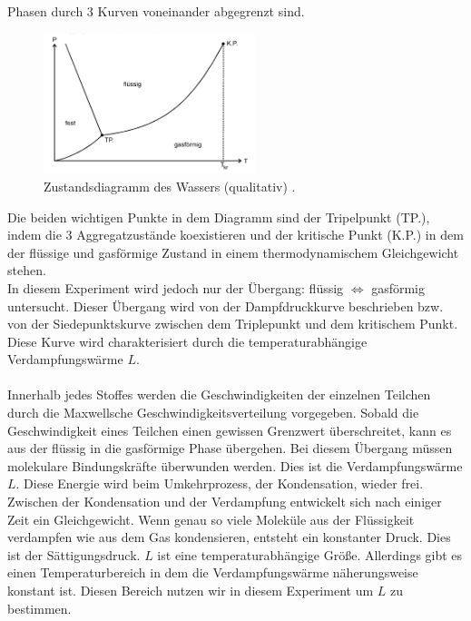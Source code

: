 \glqq Phasen\grqq{} durch 3 Kurven voneinander abgegrenzt sind.\\
\begin{figure}[H]
    \centering
    \includegraphics[width=0.55\textwidth]{images/Diagramm.PNG}
    \caption{Zustandsdiagramm des Wassers (qualitativ) \protect \cite{V203}.}
    \label{img:Zustand}
\end{figure}
\noindent Die beiden wichtigen Punkte in dem Diagramm sind der Tripelpunkt (TP.), indem die 
3 Aggregatzustände koexistieren und der kritische Punkt (K.P.) in dem der flüssige und gasförmige Zustand in einem 
thermodynamischem Gleichgewicht stehen.\\
In diesem Experiment wird jedoch nur der Übergang: flüssig $\Leftrightarrow$ gasförmig untersucht. 
Dieser Übergang wird von der Dampfdruckkurve beschrieben bzw. von der Siedepunktskurve zwischen dem Triplepunkt und dem kritischem Punkt.
Diese Kurve wird charakterisiert durch die temperaturabhängige Verdampfungswärme $L$. \\\\
\noindent
Innerhalb jedes Stoffes werden die Geschwindigkeiten der einzelnen Teilchen
durch die Maxwellsche Geschwindigkeitsverteilung vorgegeben. Sobald die Geschwindigkeit eines Teilchen einen gewissen Grenzwert 
überschreitet, kann es aus der flüssig in die gasförmige Phase übergehen. Bei diesem Übergang müssen molekulare Bindungskräfte überwunden
werden. Dies ist die Verdampfungswärme $L$. Diese Energie wird beim Umkehrprozess, der Kondensation, wieder frei.\\
Zwischen der Kondensation und der Verdampfung entwickelt sich nach einiger Zeit ein Gleichgewicht.
Wenn genau so viele Moleküle aus der Flüssigkeit verdampfen wie aus dem Gas kondensieren, entsteht ein konstanter Druck.
Dies ist der Sättigungsdruck. $L$ ist eine temperaturabhängige Größe.
Allerdings gibt es einen Temperaturbereich in dem die Verdampfungswärme näherungsweise konstant ist.
Diesen Bereich nutzen wir in diesem Experiment um $L$ zu bestimmen.\\
